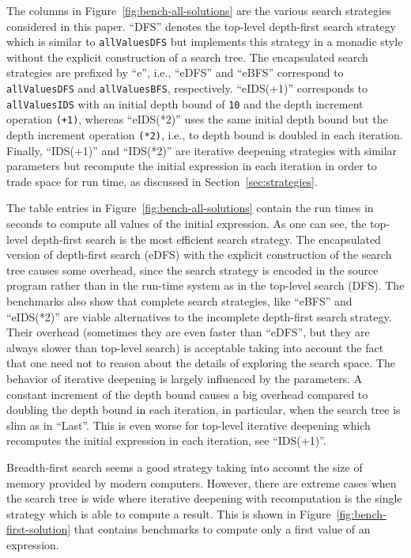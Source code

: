 \documentclass[english]{lni}
\newcommand{\code}[1]{\texttt{\small{}#1}}
\begin{document}
The columns in Figure~\ref{fig:bench-all-solutions}
are the various search strategies considered in this paper.
``DFS'' denotes the top-level depth-first search strategy
which is similar to \code{allValuesDFS} but implements
this strategy in a monadic style without the explicit
construction of a search tree.
The encapsulated search strategies are prefixed by ``e'',
i.e., ``eDFS'' and ``eBFS'' correspond to \code{allValuesDFS}
and \code{allValuesBFS}, respectively.
``eIDS(+1)'' corresponds to \code{allValuesIDS}
with an initial depth bound of \code{10} and the depth increment
operation \code{(+1)}, whereas ``eIDS(*2)'' uses the same initial depth bound
but the depth increment operation \code{(*2)}, i.e., to depth bound
is doubled in each iteration.
Finally, ``IDS(+1)'' and ``IDS(*2)'' are iterative deepening
strategies with similar parameters but recompute the initial
expression in each iteration in order to trade space for run time,
as discussed in Section~\ref{sec:strategies}.

The table entries in Figure~\ref{fig:bench-all-solutions}
contain the run times in seconds to compute all values of the initial
expression.
As one can see, the top-level depth-first search is the most efficient
search strategy.
The encapsulated version of depth-first search (eDFS)
with the explicit construction of the search tree
causes some overhead, since the search strategy
is encoded in the source program rather than in the run-time system
as in the top-level search (DFS).
The benchmarks also show that
complete search strategies, like ``eBFS'' and ``eIDS(*2)''
are viable alternatives to the incomplete depth-first search strategy.
Their overhead (sometimes they are even faster than ``eDFS'',
but they are always slower than top-level search)
is acceptable taking into account the fact
that one need not to reason about the details of exploring the
search space. The behavior of iterative deepening is largely
influenced by the parameters.
A constant increment of the depth bound causes a big overhead
compared to doubling the depth bound in each iteration,
in particular, when the search tree is slim as in ``Last''.
This is even worse for top-level iterative deepening
which recomputes the initial expression in each iteration,
see ``IDS(+1)''.

Breadth-first search seems a good strategy
taking into account the size of memory provided by modern computers.
However, there are extreme cases when the search tree is wide
where iterative deepening with recomputation is the single
strategy which is able to compute a result.
This is shown in Figure~\ref{fig:bench-first-solution}
that contains benchmarks to compute only a first value
of an expression.
\end{document}

